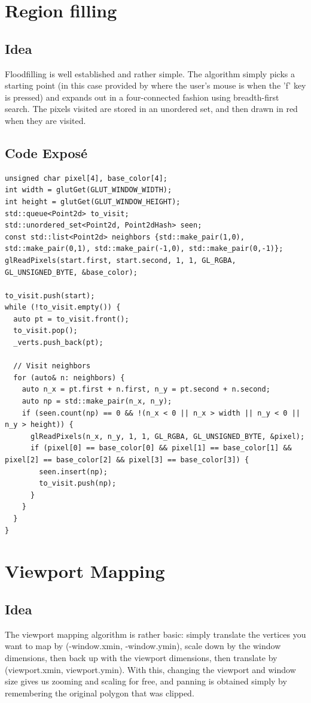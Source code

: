 \documentclass{article}
\begin{document}
\section{Region filling}
\label{sec:orgheadline7}
\subsection{Idea}
\label{sec:orgheadline5}
Floodfilling is well established and rather simple. The algorithm simply picks a starting point (in this case provided by
where the user's mouse is when the 'f' key is pressed) and expands out in a four-connected fashion using breadth-first search.
The pixels visited are stored in an unordered set, and then drawn in red when they are visited.
\subsection{Code Exposé}
\label{sec:orgheadline6}
\begin{verbatim}
unsigned char pixel[4], base_color[4];
int width = glutGet(GLUT_WINDOW_WIDTH);
int height = glutGet(GLUT_WINDOW_HEIGHT);
std::queue<Point2d> to_visit;
std::unordered_set<Point2d, Point2dHash> seen;
const std::list<Point2d> neighbors {std::make_pair(1,0), std::make_pair(0,1), std::make_pair(-1,0), std::make_pair(0,-1)};
glReadPixels(start.first, start.second, 1, 1, GL_RGBA, GL_UNSIGNED_BYTE, &base_color);

to_visit.push(start);
while (!to_visit.empty()) {
  auto pt = to_visit.front();
  to_visit.pop();
  _verts.push_back(pt);

  // Visit neighbors
  for (auto& n: neighbors) {
    auto n_x = pt.first + n.first, n_y = pt.second + n.second;
    auto np = std::make_pair(n_x, n_y);
    if (seen.count(np) == 0 && !(n_x < 0 || n_x > width || n_y < 0 || n_y > height)) {
      glReadPixels(n_x, n_y, 1, 1, GL_RGBA, GL_UNSIGNED_BYTE, &pixel);
      if (pixel[0] == base_color[0] && pixel[1] == base_color[1] && pixel[2] == base_color[2] && pixel[3] == base_color[3]) {
        seen.insert(np);
        to_visit.push(np);
      }
    }
  }
}
\end{verbatim}
\section{Viewport Mapping}
\label{sec:orgheadline10}
\subsection{Idea}
\label{sec:orgheadline8}
The viewport mapping algorithm is rather basic: simply translate the vertices you want to map by (-window.xmin, -window.ymin),
scale down by the window dimensions, then back up with the viewport dimensions, then translate by (viewport.xmin, viewport.ymin).
With this, changing the viewport and window size gives us zooming and scaling for free, and panning is obtained simply by
remembering the original polygon that was clipped.
\end{document}
